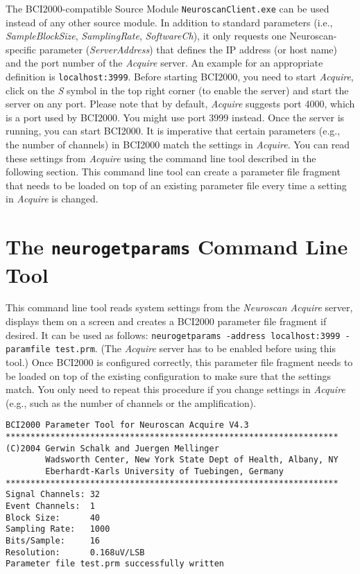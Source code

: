 \documentclass[letterpaper, oneside, 12pt]{article}
\newcommand{\ie}{i.e.,}
\newcommand{\eg}{e.g.,}
\begin{document}
The BCI2000-compatible Source Module \texttt{NeuroscanClient.exe} can
be
used instead
of any other source module. In addition to standard parameters (\ie{}
\emph{SampleBlockSize}, \emph{SamplingRate}, \emph{SoftwareCh}), it
only
requests one Neuroscan-specific parameter (\emph{ServerAddress}) that
defines
the IP address (or host name) and the port number of the
\emph{Acquire} server.
An example for an appropriate definition is \texttt{localhost:3999}.
Before
starting BCI2000, you need to start \emph{Acquire}, click on the
\emph{S} symbol
in the top right corner (to enable the server) and start the server on
any port.
Please note that by default, \emph{Acquire} suggests port 4000, which
is a port
used by BCI2000. You might use port 3999 instead. Once the server is
running,
you can start BCI2000. It is imperative that certain parameters (\eg{}
the
number of channels) in BCI2000 match the settings in \emph{Acquire}.
You can
read these settings from \emph{Acquire} using the command line tool
described in
the following section. This command line tool can create a parameter
file
fragment that needs to be loaded on top of an existing parameter file
every time
a setting in \emph{Acquire} is changed.

\section{The \texttt{neurogetparams} Command Line Tool}

This command line tool reads system settings from the \emph{Neuroscan
Acquire}
server, displays them on a screen and creates a BCI2000 parameter file
fragment
if desired. It can be used as follows: \texttt{neurogetparams -address
localhost:3999 -paramfile test.prm}. (The \emph{Acquire} server has to
be
enabled before using this tool.) Once BCI2000 is configured correctly,
this
parameter file fragment needs to be loaded on top of the existing
configuration
to make sure that the settings match. You only need to repeat this
procedure if
you change settings in \emph{Acquire} (\eg{} such as the number of
channels or
the amplification).

\begin{verbatim}
BCI2000 Parameter Tool for Neuroscan Acquire V4.3
*******************************************************************
(C)2004 Gerwin Schalk and Juergen Mellinger
        Wadsworth Center, New York State Dept of Health, Albany, NY
        Eberhardt-Karls University of Tuebingen, Germany
*******************************************************************
Signal Channels: 32
Event Channels:  1
Block Size:      40
Sampling Rate:   1000
Bits/Sample:     16
Resolution:      0.168uV/LSB
Parameter file test.prm successfully written
\end{verbatim}
\end{document}
